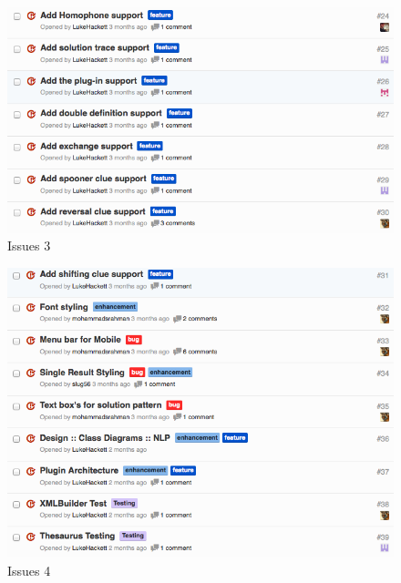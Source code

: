 \begin{figure}[H]
  \centering
  \includegraphics[width=\linewidth]{images/issues3.png}
  \caption{Issues 3}
  \label{fig:issues3}
\end{figure}
\begin{figure}[H]
  \centering
  \includegraphics[width=\linewidth]{images/issues4.png}
  \caption{Issues 4}
  \label{fig:issues4}
\end{figure}
